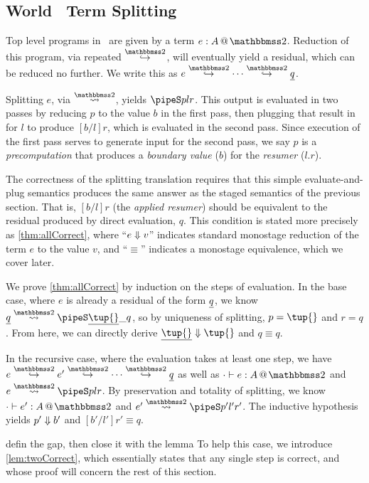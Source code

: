 \begin{abstrsyn}
\subsection{World \bbtwo\ Term Splitting}

Top level programs in \lang\ are given by a term $\coltwo e A$.
Reduction of this program, via repeated $\stepsym \bbtwo$, will eventually yield a residual, which can be reduced no further.
We write this as $e \stepsym \bbtwo \cdots \stepsym \bbtwo \exv q$.

Splitting $e$, via $\splittwosym$, yields $\pipeS p l r$.
This output is evaluated in two passes by reducing $p$ to the value $b$ in the first pass,
then plugging that result in for $l$ to produce $[b/l]r$,
which is evaluated in the second pass.
Since execution of the first pass serves to generate input for
the second pass, we say $p$ is a {\em precomputation} that produces a
{\em boundary value} ($b$) for the {\em resumer} ($l.r$).

The correctness of the splitting translation requires that this simple 
evaluate-and-plug semantics produces the same answer as the staged semantics of the previous section.
That is, $[b/l]r$ (the \emph{applied resumer}) should be equivalent 
to the residual produced by direct evaluation, $q$.
This condition is stated more precisely as \ref{thm:allCorrect},
where ``${e} \Downarrow {v}$'' indicates standard monostage reduction of the term $e$ to the value $v$,
and ``$\equiv$'' indicates a monostage equivalence, which we cover later.

We prove \ref{thm:allCorrect} by induction on the steps of evaluation.  
In the base case, where $e$ is already a residual of the form $\underline{q}$, we know
$\splittwo {\exv q} A {\exv{\tup{}}} \_ q$, so by uniqueness of splitting, 
$p = \tup{}$ and $r = q$.
From here, we can directly derive $\reduce {\exv {\tup {}}} {\tup {}}$ and $q \equiv q$.

In the recursive case, where the evaluation takes at least one step, we have 
$e \stepsym \bbtwo e' \stepsym \bbtwo \cdots \stepsym \bbtwo \exv q$
as well as \mbox{$\typestwo [\cdot] e A$} 
and \mbox{$\splittwo e A p l r$}.
By preservation and totality of splitting, we know $\typestwo [\cdot] {e'} A$ and $\splittwo {e'} A {p'} {l'} {r'}$.
The inductive hypothesis yields ${p'} \Downarrow {b'}$ and $[b'/l']r' \equiv q$.

\TODO defin the gap, then close it with the lemma
To help this case, we introduce \ref{lem:twoCorrect}, 
which essentially states that any single step is correct,
and whose proof will concern the rest of this section.


\end{abstrsyn}
